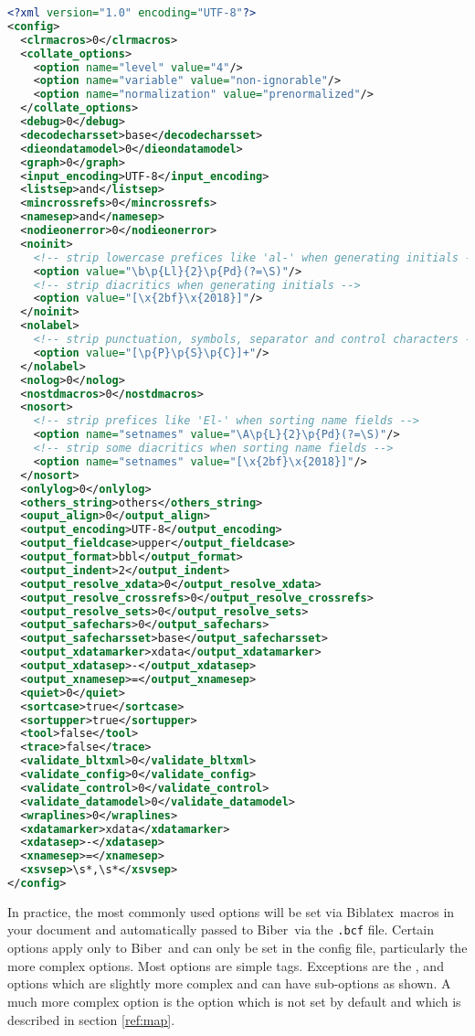 \documentclass{ltxdockit}
\newcommand*{\biber}{Biber\xspace}
\newcommand*{\biblatex}{Biblatex\xspace}
\begin{document}
\begin{lstlisting}[language=xml]
<?xml version="1.0" encoding="UTF-8"?>
<config>
  <clrmacros>0</clrmacros>
  <collate_options>
    <option name="level" value="4"/>
    <option name="variable" value="non-ignorable"/>
    <option name="normalization" value="prenormalized"/>
  </collate_options>
  <debug>0</debug>
  <decodecharsset>base</decodecharsset>
  <dieondatamodel>0</dieondatamodel>
  <graph>0</graph>
  <input_encoding>UTF-8</input_encoding>
  <listsep>and</listsep>
  <mincrossrefs>0</mincrossrefs>
  <namesep>and</namesep>
  <nodieonerror>0</nodieonerror>
  <noinit>
    <!-- strip lowercase prefices like 'al-' when generating initials -->
    <option value="\b\p{Ll}{2}\p{Pd}(?=\S)"/>
    <!-- strip diacritics when generating initials -->
    <option value="[\x{2bf}\x{2018}]"/>
  </noinit>
  <nolabel>
    <!-- strip punctuation, symbols, separator and control characters -->
    <option value="[\p{P}\p{S}\p{C}]+"/> 
  </nolabel>
  <nolog>0</nolog>
  <nostdmacros>0</nostdmacros>
  <nosort>
    <!-- strip prefices like 'El-' when sorting name fields -->
    <option name="setnames" value="\A\p{L}{2}\p{Pd}(?=\S)"/>
    <!-- strip some diacritics when sorting name fields -->
    <option name="setnames" value="[\x{2bf}\x{2018}]"/>
  </nosort>
  <onlylog>0</onlylog>
  <others_string>others</others_string>
  <ouput_align>0</output_align>
  <output_encoding>UTF-8</output_encoding>
  <output_fieldcase>upper</output_fieldcase>
  <output_format>bbl</output_format>
  <output_indent>2</output_indent>
  <output_resolve_xdata>0</output_resolve_xdata>
  <output_resolve_crossrefs>0</output_resolve_crossrefs>
  <output_resolve_sets>0</output_resolve_sets>
  <output_safechars>0</output_safechars>
  <output_safecharsset>base</output_safecharsset>
  <output_xdatamarker>xdata</output_xdatamarker>
  <output_xdatasep>-</output_xdatasep>
  <output_xnamesep>=</output_xnamesep>
  <quiet>0</quiet>
  <sortcase>true</sortcase>
  <sortupper>true</sortupper>
  <tool>false</tool>
  <trace>false</trace>
  <validate_bltxml>0</validate_bltxml>
  <validate_config>0</validate_config>
  <validate_control>0</validate_control>
  <validate_datamodel>0</validate_datamodel>
  <wraplines>0</wraplines>
  <xdatamarker>xdata</xdatamarker>
  <xdatasep>-</xdatasep>
  <xnamesep>=</xnamesep>
  <xsvsep>\s*,\s*</xsvsep>
</config>
\end{lstlisting}

\noindent In practice, the most commonly used options will be set via
\biblatex\ macros in your document and automatically passed to \biber\
via the \verb+.bcf+ file. Certain options apply only to \biber\ and can
only be set in the config file, particularly the more complex
options. Most options are simple tags. Exceptions are the
,  and  options which are slightly
more complex and can have sub-options as shown. A much more complex
option is the \opt{sourcemap} option which is not set by default and
which is described in section \ref{ref:map}.
\end{document}
